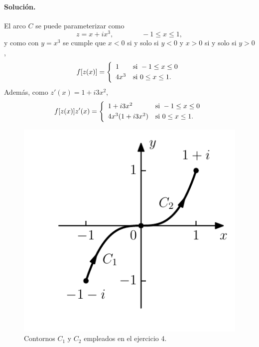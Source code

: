 \documentclass[a4paper]{report}
\begin{document}
\paragraph{Solución.} El arco \(C\) se puede parameterizar como 
\[
 z=x+ix^3,
 \qquad\qquad
 -1\leq x\leq1,
\]
y como con \(y=x^3\) se cumple que \(x<0\) si y solo si \(y<0\) y \(x>0\) si y solo si \(y>0\),
\[
 f[z(x)]=\left\{ 
 \begin{array}{ll}
  1 & \textrm{si }-1\leq x\leq 0\\[\smallskipamount]
  4x^3 & \textrm{si }0\leq x\leq 1.
 \end{array}
 \right.
\]
Además, como \(z'(x)=1+i3x^2\),
\[
 f[z(x)]z'(x)=\left\{ 
 \begin{array}{ll}
  1+i3x^2 & \textrm{si }-1\leq x\leq0\\[\smallskipamount]
  4x^3(1+i3x^2) & \textrm{si }0\leq x\leq 1.
 \end{array}
 \right.
\]
\begin{figure}[!htb]
  \begin{minipage}[c]{0.35\textwidth}
    \includegraphics[width=\textwidth]{figuras/exercise_46_04.pdf}
  \end{minipage}\hfill
  \begin{minipage}[c]{0.55\textwidth}
    \caption{
        Contornos \(C_1\) y \(C_2\) empleados en el ejercicio 4.
    }\label{fig:exercise_46_04}
  \end{minipage}
\end{figure}
\end{document}
